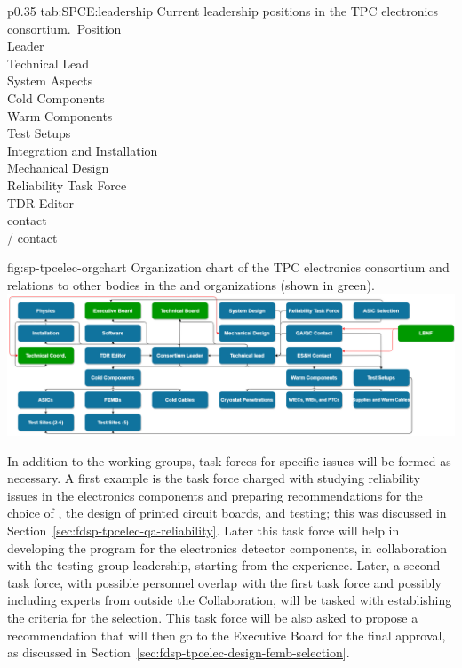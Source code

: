 \begin{dunetable}
{p{0.35\textwidth}}
{tab:SPCE:leadership}
{Current leadership positions in the TPC electronics consortium.}\
Position \\ \toprowrule
Leader \\ \colhline 
Technical Lead \\ \colhline 
System Aspects \\ \colhline 
Cold Components \\ \colhline 
Warm Components \\ \colhline 
Test Setups \\ \colhline 
Integration and Installation \\ \colhline
Mechanical Design \\ \colhline 
Reliability Task Force \\ \colhline 
TDR Editor \\ \colhline 
{} contact \\ \colhline 
{}/ contact \\ \colhline 
\end{dunetable}

\begin{dunefigure}
{fig:sp-tpcelec-orgchart}
{Organization chart of the TPC electronics consortium and relations to
other bodies in the \dword{lbnf} and \dword{dune} organizations (shown in green).}
\includegraphics[width=\linewidth]{sp-tpcelec-orgchart.png}
\end{dunefigure}


In addition to the working groups, task forces for specific issues 
will be formed as necessary. A first example is the task force
charged with studying reliability issues in the  electronics 
components and preparing recommendations for the choice of 
, the design of printed circuit boards, and testing; this
was discussed in Section~\ref{sec:fdsp-tpcelec-qa-reliability}. 
Later this task force will help in developing the \dword{qc} 
program for the  electronics detector components, in collaboration
with the testing group leadership, starting from the \dword{pdsp} 
experience. Later, a second task force, with possible
personnel overlap with the first task force and possibly including experts
from outside the \dword{dune} Collaboration, will be tasked with establishing the
criteria for the \dword{asic} selection. This task force will
be also asked to propose a recommendation that will then go to
the  Executive Board for the final approval, as discussed
in Section~\ref{sec:fdsp-tpcelec-design-femb-selection}.

